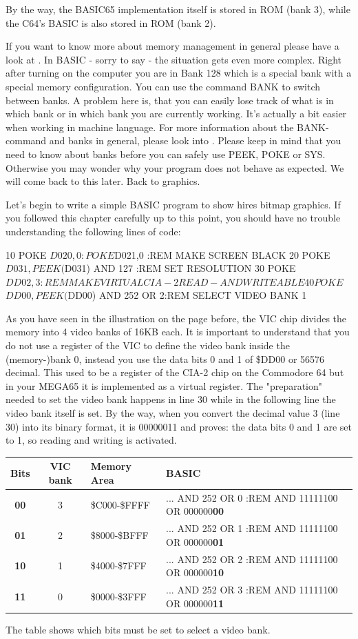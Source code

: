 By the way, the BASIC65 implementation itself is stored in ROM (bank 3), while the C64's BASIC is also stored in ROM (bank 2).

If you want to know more about memory management in general please have a look at . In BASIC - sorry to say - the situation gets even more complex. Right after turning on the computer you are in Bank 128 which is a special bank with a special memory configuration. You can use the command BANK to switch between banks. A problem here is, that you can easily lose track of what is in which bank or in which bank you are currently working. It's actually a bit easier when working in machine language. For more information about the BANK-command and banks in general, please look into . Please keep in mind that you need to know about banks before you can safely use PEEK, POKE or SYS. Otherwise you may wonder why your program does not behave as expected. We will come back to this later. Back to graphics.

Let's begin to write a simple BASIC program to show hires bitmap graphics. If you followed this chapter carefully up to this point, you should have no trouble understanding the following lines of code:

\begin{screencode}
10 POKE $D020,0 : POKE $D021,0          :REM MAKE SCREEN BLACK
20 POKE $D031, PEEK($D031) AND 127      :REM SET RESOLUTION
30 POKE $DD02, 3                        :REM MAKE VIRTUAL CIA-2 READ- AND WRITEABLE
40 POKE $$DD00, PEEK($DD00) AND 252 OR 2:REM SELECT VIDEO BANK 1
\end{screencode}

As you have seen in the illustration on the page before, the VIC chip divides the memory into 4 video banks of 16KB each. It is important to understand that you do not use a register of the VIC to define the video bank inside the (memory-)bank 0, instead you use the data bits 0 and 1 of \$DD00 or 56576 decimal. This used to be a register of the CIA-2 chip on the Commodore 64 but in your MEGA65 it is implemented as a virtual register. The "preparation" needed to set the video bank happens in line 30 while in the following line the video bank itself is set. By the way, when you convert the decimal value 3 (line 30) into its binary format, it is 00000011 and proves: the data bits 0 and 1 are set to 1, so reading and writing is activated.

\begin{tabular}{|c|c|l|l|}
	\hline
	Bits & VIC bank & Memory Area & BASIC \\
	\hline
	 \textbf{00} & 3 & \$C000-\$FFFF & ... AND 252 OR 0 :REM AND 11111100 OR 000000\textbf{00} \\
	 \textbf{01} & 2 & \$8000-\$BFFF & ... AND 252 OR 1 :REM AND 11111100 OR 000000\textbf{01} \\
	 \textbf{10} & 1 & \$4000-\$7FFF & ... AND 252 OR 2 :REM AND 11111100 OR 000000\textbf{10} \\
	 \textbf{11} & 0 & \$0000-\$3FFF & ... AND 252 OR 3 :REM AND 11111100 OR 000000\textbf{11} \\
	\hline
\end{tabular}

The table shows which bits must be set to select a video bank.
